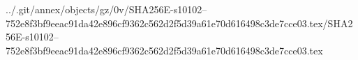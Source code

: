 ../.git/annex/objects/gz/0v/SHA256E-s10102--752e8f3bf9eeac91da42e896cf9362c562d2f5d39a61e70d616498c3de7cce03.tex/SHA256E-s10102--752e8f3bf9eeac91da42e896cf9362c562d2f5d39a61e70d616498c3de7cce03.tex